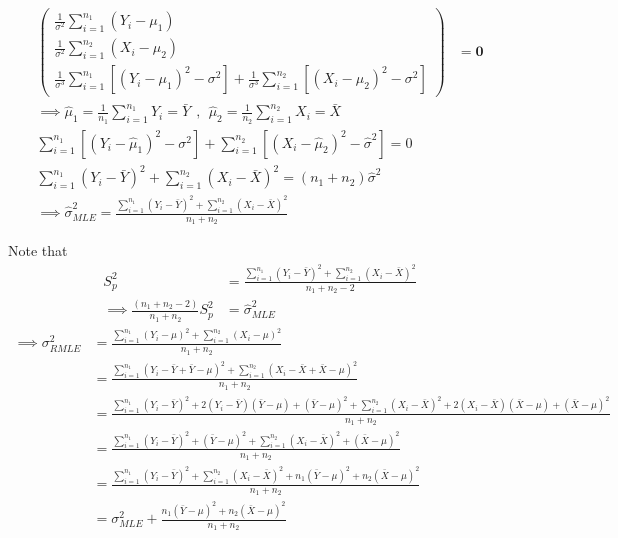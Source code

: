 \documentclass[
  letterpaper,
  DIV=11,
  numbers=noendperiod]{scrreprt}
\begin{document}
\[\begin{aligned}
\begin{pmatrix} \frac 1 {\sigma^2} \sum_{i=1}^{n_1} (Y_i-\mu_1)\\
\frac 1 {\sigma^2} \sum_{i=1}^{n_2} (X_i-\mu_2)\\
\frac 1 {\sigma^3} \sum_{i=1}^{n_1} [(Y_i-\mu_1)^2-\sigma^2] +\frac 1 {\sigma^3} \sum_{i=1}^{n_2} [(X_i-\mu_2)^2 - \sigma^2] \end{pmatrix} &= \mathbf 0 \\
\implies \hat \mu_1 = \frac 1 {n_1} \sum_{i=1}^{n_1} Y_i = \bar Y ~~,~~\hat \mu_2 = \frac 1 {n_2} \sum_{i=1}^{n_2} X_i = \bar X \\
\sum_{i=1}^{n_1} [(Y_i-\hat \mu_1)^2-\sigma^2] + \sum_{i=1}^{n_2} [(X_i-\hat \mu_2)^2 - \hat \sigma^2] = 0 \\
\sum_{i=1}^{n_1} (Y_i-\bar Y)^2 + \sum_{i=1}^{n_2} (X_i-\bar X)^2  =  (n_1+ n_2) \hat \sigma^2 \\
\implies \hat \sigma_{MLE} ^2 = \frac{\sum_{i=1}^{n_1} (Y_i-\bar Y)^2 + \sum_{i=1}^{n_2} (X_i-\bar X)^2 }{n_1+n_2}
\end{aligned}
\]

Note that \[\begin{aligned}
S_p^2 &= \frac{\sum_{i=1}^{n_1} (Y_i-\bar Y)^2 + \sum_{i=1}^{n_2} (X_i-\bar X)^2 }{n_1+n_2-2} \\
\implies \frac{(n_1+ n_2 -2)}{n_1+n_2}S_p^2 &= \hat \sigma^2_{MLE}
\end{aligned}\] \[
\begin{aligned}
\implies  \sigma_{RMLE} ^2 
&= \frac{\sum_{i=1}^{n_1} (Y_i- \mu)^2 + \sum_{i=1}^{n_2} (X_i- \mu)^2 }{n_1+n_2}\\
&= \frac{\sum_{i=1}^{n_1} (Y_i-\bar Y + \bar Y- \mu)^2 + \sum_{i=1}^{n_2} (X_i- \bar X + \bar X- \mu)^2 }{n_1+n_2}\\
&= \frac{\sum_{i=1}^{n_1} (Y_i-\bar Y)^2 + 2(Y_i-\bar Y)(\bar Y- \mu) +(\bar Y- \mu)^2 + \sum_{i=1}^{n_2} (X_i-\bar X)^2 + 2(X_i-\bar X)(\bar X- \mu) +(\bar X- \mu)^2  }{n_1+n_2}\\
&= \frac{\sum_{i=1}^{n_1} (Y_i-\bar Y)^2  +(\bar Y- \mu)^2 + \sum_{i=1}^{n_2} (X_i-\bar X)^2 +(\bar X- \mu)^2  }{n_1+n_2}\\
&= \frac{\sum_{i=1}^{n_1} (Y_i-\bar Y)^2 + \sum_{i=1}^{n_2} (X_i-\bar X)^2 +n_1(\bar Y- \mu)^2+n_2(\bar X- \mu)^2  }{n_1+n_2}\\
&= \sigma^2_{MLE}+\frac{n_1(\bar Y- \mu)^2+n_2(\bar X- \mu)^2  }{n_1+n_2}
\end{aligned}\]
\end{document}
